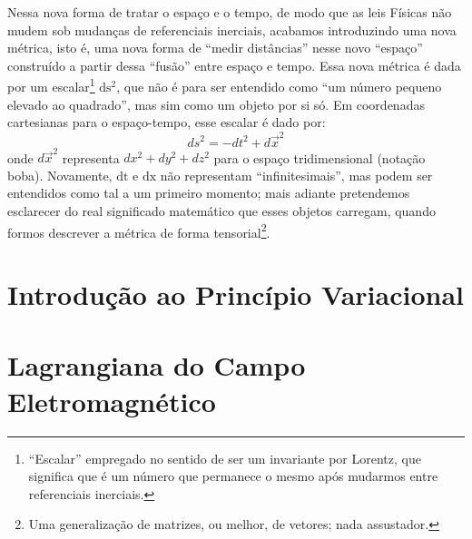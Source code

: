 \documentclass[12pt,a4paper]{article}
\begin{document}
Nessa nova forma de tratar o espaço e o tempo, de modo que as leis Físicas não mudem sob mudanças de referenciais
inerciais, acabamos introduzindo uma nova métrica, isto é, uma nova forma de \enquote{medir distâncias} nesse novo
\enquote{espaço} construído a partir dessa \enquote{fusão} entre espaço e tempo. Essa nova métrica é dada
por um escalar\footnote{\enquote{Escalar} empregado no sentido de ser um invariante por Lorentz, que significa que é um número que permanece o mesmo após mudarmos entre referenciais inerciais.}
$\mathrm{ds^2}$, que não é para ser entendido como \enquote{um número pequeno elevado ao quadrado}, mas sim 
como um objeto por si só. Em coordenadas cartesianas para o espaço-tempo, esse escalar é dado por:
\begin{equation*}
  ds^2 = -dt^2 + d\vec{x}^2
\end{equation*}
onde $d\vec{x}^2$ representa $dx^2 + dy^2 + dz^2$ para o espaço tridimensional (notação boba). Novamente,
$\mathrm{dt}$ e $\mathrm{dx}$ não representam \enquote{infinitesimais}, mas podem ser entendidos como tal a um primeiro momento;
mais adiante pretendemos esclarecer do real significado matemático que esses objetos carregam, quando formos
descrever a métrica de forma tensorial\footnote{Uma generalização de matrizes, ou melhor, de vetores; nada assustador.}.


\section{Introdução ao Princípio Variacional}

\section{Lagrangiana do Campo Eletromagnético}


\printbibliography
\end{document}
